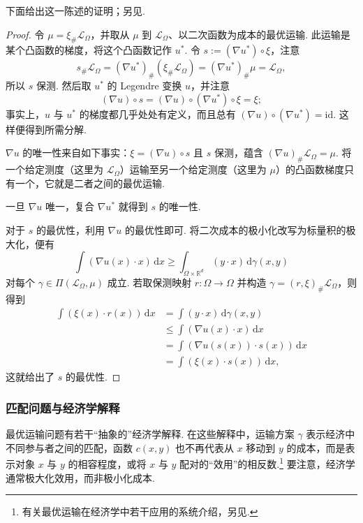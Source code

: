 下面给出这一陈述的证明；另见\cite{b84}.
\begin{proof}
令 $\mu=\xi_\#\mathscr L_\Omega$，并取从 $\mu$ 到 $\mathscr L_\Omega$、以二次函数为成本的最优运输. 此运输是某个凸函数的梯度，将这个凸函数记作 $u^*$. 令 $s:=(\nabla u^*)\circ\xi$，注意
\[
 s_\#\mathscr L_\Omega
 =(\nabla u^*)_\#(\xi_\#\mathscr L_\Omega)
 =(\nabla u^*)_\#\mu=\mathscr L_\Omega,
\]
所以 $s$ 保测. 然后取 $u^*$ 的 Legendre 变换 $u$，并注意
\[
 (\nabla u)\circ s
 =(\nabla u)\circ(\nabla u^*)\circ\xi=\xi;
\]
事实上，$u$ 与 $u^*$ 的梯度都几乎处处有定义，而且总有 $(\nabla u)\circ(\nabla u^*)=\mathrm{id}$. 这样便得到所需分解.

$\nabla u$ 的唯一性来自如下事实：$\xi=(\nabla u)\circ s$ 且 $s$ 保测，蕴含 $(\nabla u)_\#\mathscr L_\Omega=\mu$. 将一个给定测度（这里为 $\mathscr L_\Omega$）运输至另一个给定测度（这里为 $\mu$）的凸函数梯度只有一个，它就是二者之间的最优运输.

一旦 $\nabla u$ 唯一，复合 $\nabla u^*$ 就得到 $s$ 的唯一性.

对于 $s$ 的最优性，利用 $\nabla u$ 的最优性即可. 将二次成本的极小化改写为标量积的极大化，便有
\[
 \int(\nabla u(x)\cdot x)\,\mathrm dx
 \geq\int_{\Omega\times\mathbb R^d}(y\cdot x)\,\mathrm d\gamma(x,y)
\]
对每个 $\gamma\in\Pi(\mathscr L_\Omega,\mu)$ 成立. 若取保测映射 $r:\Omega\to\Omega$ 并构造 $\gamma=(r,\xi)_\#\mathscr L_\Omega$，则得到
\begin{equation*}
\begin{aligned}
 \int(\xi(x)\cdot r(x))\,\mathrm dx
 &=\int(y\cdot x)\,\mathrm d\gamma(x,y)\\
 &\leq\int(\nabla u(x)\cdot x)\,\mathrm dx\\
 &=\int(\nabla u(s(x))\cdot s(x))\,\mathrm dx\\
 &=\int(\xi(x)\cdot s(x))\,\mathrm dx,
\end{aligned}
\end{equation*}
这就给出了 $s$ 的最优性.
\end{proof}

\subsubsection{匹配问题与经济学解释}\label{sec:1.7.3}

最优运输问题有若干“抽象的”经济学解释. 在这些解释中，运输方案 $\gamma$ 表示经济中不同参与者之间的匹配，函数 $c(x,y)$ 也不再代表从 $x$ 移动到 $y$ 的成本，而是表示对象 $x$ 与 $y$ 的相容程度，或将 $x$ 与 $y$ 配对的“效用”的相反数.\footnote{有关最优运输在经济学中若干应用的系统介绍，另见\cite{b228}.} 要注意，经济学通常极大化效用，而非极小化成本.

